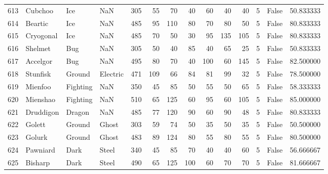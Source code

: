 \begin{tabular}{rlllrrrrrrrrlr}
 613 &                    Cubchoo &       Ice &       NaN &    305 &   55 &      70 &       40 &       60 &       40 &     40 &           5 &      False &   50.833333 \\
 614 &                    Beartic &       Ice &       NaN &    485 &   95 &     110 &       80 &       70 &       80 &     50 &           5 &      False &   80.833333 \\
 615 &                  Cryogonal &       Ice &       NaN &    485 &   70 &      50 &       30 &       95 &      135 &    105 &           5 &      False &   80.833333 \\
 616 &                    Shelmet &       Bug &       NaN &    305 &   50 &      40 &       85 &       40 &       65 &     25 &           5 &      False &   50.833333 \\
 617 &                   Accelgor &       Bug &       NaN &    495 &   80 &      70 &       40 &      100 &       60 &    145 &           5 &      False &   82.500000 \\
 618 &                   Stunfisk &    Ground &  Electric &    471 &  109 &      66 &       84 &       81 &       99 &     32 &           5 &      False &   78.500000 \\
 619 &                    Mienfoo &  Fighting &       NaN &    350 &   45 &      85 &       50 &       55 &       50 &     65 &           5 &      False &   58.333333 \\
 620 &                   Mienshao &  Fighting &       NaN &    510 &   65 &     125 &       60 &       95 &       60 &    105 &           5 &      False &   85.000000 \\
 621 &                  Druddigon &    Dragon &       NaN &    485 &   77 &     120 &       90 &       60 &       90 &     48 &           5 &      False &   80.833333 \\
 622 &                     Golett &    Ground &     Ghost &    303 &   59 &      74 &       50 &       35 &       50 &     35 &           5 &      False &   50.500000 \\
 623 &                     Golurk &    Ground &     Ghost &    483 &   89 &     124 &       80 &       55 &       80 &     55 &           5 &      False &   80.500000 \\
 624 &                   Pawniard &      Dark &     Steel &    340 &   45 &      85 &       70 &       40 &       40 &     60 &           5 &      False &   56.666667 \\
 625 &                    Bisharp &      Dark &     Steel &    490 &   65 &     125 &      100 &       60 &       70 &     70 &           5 &      False &   81.666667 \\

\end{tabular}
